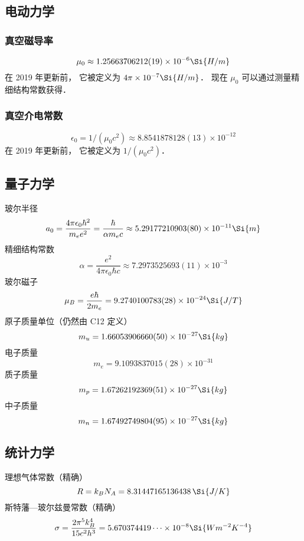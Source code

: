 \subsection{电动力学}

\subsubsection{真空磁导率}
\begin{equation}
\mu_0 \approx 1.25663706212(19)\times 10^{-6} \Si{H/m}
\end{equation}
在 2019 年更新前， 它被定义为 $4\pi\times 10^{-7} \Si{H/m}$． 现在 $\mu_0$ 可以通过测量精细结构常数获得．

\subsubsection{真空介电常数}
\begin{equation}
\epsilon_0 = 1/(\mu_0 c^2) \approx 8.8541878128(13)\times 10^{-12}
\end{equation}
在 2019 年更新前， 它被定义为 $1/(\mu_0 c^2)$．

\subsection{量子力学}
玻尔半径
\begin{equation}
a_0 = \frac{4\pi \epsilon_0 \hbar^2}{m_e e^2} = \frac{\hbar}{\alpha m_e c} \approx 5.29177210903(80)\times 10^{-11}\Si{m}
\end{equation}
精细结构常数
\begin{equation}
\alpha = \frac{e^2}{4\pi\epsilon_0\hbar c} \approx 7.2973525693(11)\times 10^{-3}
\end{equation}
玻尔磁子
\begin{equation}
\mu_B = \frac{e\hbar}{2m_e} = 9.2740100783(28)\times 10^{-24} \Si{J/T}
\end{equation}
原子质量单位（仍然由 C12 定义）
\begin{equation}
m_u = 1.66053906660(50)\times 10^{-27} \Si{kg}
\end{equation}
电子质量
\begin{equation}
m_e = 9.1093837015(28)\times 10^{-31}
\end{equation}
质子质量
\begin{equation}
m_p = 1.67262192369(51)\times 10^{-27}\Si{kg}
\end{equation}
中子质量
\begin{equation}
m_n = 1.67492749804(95)\times 10^{-27}\Si{kg}
\end{equation}


\subsection{统计力学}
理想气体常数（精确）
\begin{equation}
R = k_B N_A = 8.31447165136438 \,\Si{J/K}
\end{equation}
斯特藩—玻尔兹曼常数（精确）
\begin{equation}
\sigma = \frac{2\pi^5k_B^4}{15c^2h^3} = 5.670374419\dots \times 10^{-8} \Si{Wm^{-2}K^{-4}}
\end{equation}
